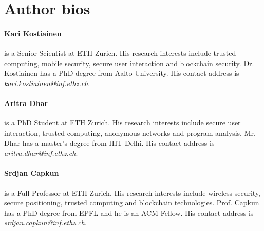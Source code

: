 
\section*{Author bios}

\begin{tcolorbox}

\paragraph{Kari Kostiainen} is a Senior Scientist at ETH Zurich. His research interests include trusted computing, mobile security, secure user interaction and blockchain security. Dr. Kostiainen has a PhD degree from Aalto University. His contact address is \emph{kari.kostiainen@inf.ethz.ch}.

\vspace{10pt}
\paragraph{Aritra Dhar} is a PhD Student at ETH Zurich. His research interests include secure user interaction, trusted computing, anonymous networks and program analysis. Mr. Dhar has a master's degree from IIIT Delhi. His contact address is \emph{aritra.dhar@inf.ethz.ch}.

\vspace{10pt}
\paragraph{Srdjan Capkun} is a Full Professor at ETH Zurich. His research interests include wireless security, secure positioning, trusted computing and blockchain technologies. Prof. Capkun has a PhD degree from EPFL and he is an ACM Fellow. His contact address is \emph{srdjan.capkun@inf.ethz.ch}.

\end{tcolorbox}